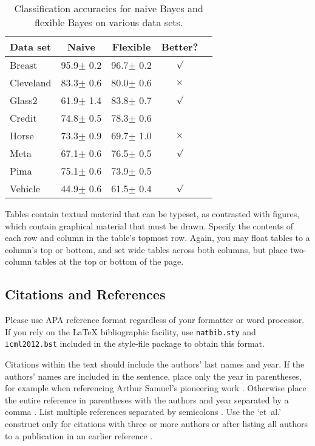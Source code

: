 \documentclass{article}
\begin{document}
\begin{table}[t]
\caption{Classification accuracies for naive Bayes and flexible 
Bayes on various data sets.}
\label{sample-table}
\vskip 0.15in
\begin{center}
\begin{small}
\begin{sc}
\begin{tabular}{lcccr}
\hline
\abovespace\belowspace
Data set & Naive & Flexible & Better? \\
\hline
\abovespace
Breast    & 95.9$\pm$ 0.2& 96.7$\pm$ 0.2& $\surd$ \\
Cleveland & 83.3$\pm$ 0.6& 80.0$\pm$ 0.6& $\times$\\
Glass2    & 61.9$\pm$ 1.4& 83.8$\pm$ 0.7& $\surd$ \\
Credit    & 74.8$\pm$ 0.5& 78.3$\pm$ 0.6&         \\
Horse     & 73.3$\pm$ 0.9& 69.7$\pm$ 1.0& $\times$\\
Meta      & 67.1$\pm$ 0.6& 76.5$\pm$ 0.5& $\surd$ \\
Pima      & 75.1$\pm$ 0.6& 73.9$\pm$ 0.5&         \\
\belowspace
Vehicle   & 44.9$\pm$ 0.6& 61.5$\pm$ 0.4& $\surd$ \\
\hline
\end{tabular}
\end{sc}
\end{small}
\end{center}
\vskip -0.1in
\end{table}

Tables contain textual material that can be typeset, as contrasted 
with figures, which contain graphical material that must be drawn. 
Specify the contents of each row and column in the table's topmost
row. Again, you may float tables to a column's top or bottom, and set
wide tables across both columns, but place two-column tables at the
top or bottom of the page.
 
\subsection{Citations and References} 

Please use APA reference format regardless of your formatter
or word processor. If you rely on the \LaTeX\/ bibliographic 
facility, use {\tt natbib.sty} and {\tt icml2012.bst} 
included in the style-file package to obtain this format.

Citations within the text should include the authors' last names and
year. If the authors' names are included in the sentence, place only
the year in parentheses, for example when referencing Arthur Samuel's
pioneering work . Otherwise place the entire
reference in parentheses with the authors and year separated by a
comma \cite{Samuel59}. List multiple references separated by
semicolons \cite{kearns89,Samuel59,mitchell80}. Use the `et~al.'
construct only for citations with three or more authors or after
listing all authors to a publication in an earlier reference \cite{MachineLearningI}.
\end{document}
